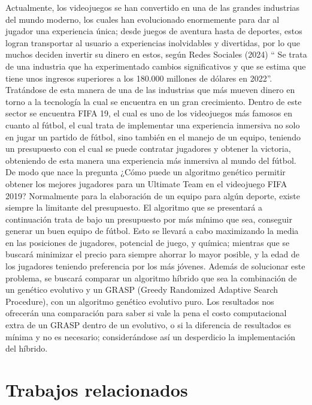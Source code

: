 \documentclass{article}
\begin{document}
Actualmente, los videojuegos se han convertido en una de las grandes industrias del mundo moderno, los cuales han evolucionado enormemente para dar al jugador una experiencia única; desde juegos de aventura hasta de deportes, estos logran transportar al usuario a experiencias inolvidables y divertidas, por lo que muchos deciden invertir su dinero en estos, según Redes Sociales (2024) “ Se trata de una industria que ha experimentado cambios significativos y que se estima que tiene unos ingresos superiores a los 180.000 millones de dólares en 2022”.  Tratándose de esta manera de una de las industrias que más mueven dinero en torno a la tecnología la cual se encuentra en un gran crecimiento.\newline
Dentro de este sector se encuentra FIFA 19, el cual es uno de los videojuegos más famosos en cuanto al fútbol,  el cual trata de implementar una experiencia inmersiva no solo en jugar un partido de fútbol, sino también en el manejo de un equipo, teniendo un presupuesto con el cual se puede contratar jugadores y obtener la victoria, obteniendo de esta manera una experiencia más inmersiva al mundo del fútbol. De modo que nace la pregunta ¿Cómo puede un algoritmo genético permitir obtener los mejores jugadores para un Ultimate Team en el videojuego FIFA 2019?\newline
Normalmente para la elaboración de un equipo para algún deporte, existe siempre la limitante del presupuesto. El algoritmo que se presentará a continuación trata de bajo un presupuesto por más mínimo que sea, conseguir generar un buen equipo de fútbol. Esto se llevará a cabo maximizando la media en las posiciones de jugadores, potencial de juego, y química; mientras que se buscará minimizar el precio para siempre ahorrar lo mayor posible, y la edad de los jugadores teniendo preferencia por los más jóvenes.\newline
Además de solucionar este problema, se buscará comparar un algoritmo híbrido que sea la combinación de un genético evolutivo y un GRASP (Greedy Randomized Adaptive Search Procedure), con un algoritmo genético evolutivo puro.\newline
Los resultados nos ofrecerán una comparación para saber si vale la pena el costo computacional extra de un GRASP dentro de un evolutivo, o si la diferencia de resultados es mínima y no es necesario; considerándose así un desperdicio la implementación del híbrido.

\section{Trabajos relacionados}
\end{document}
